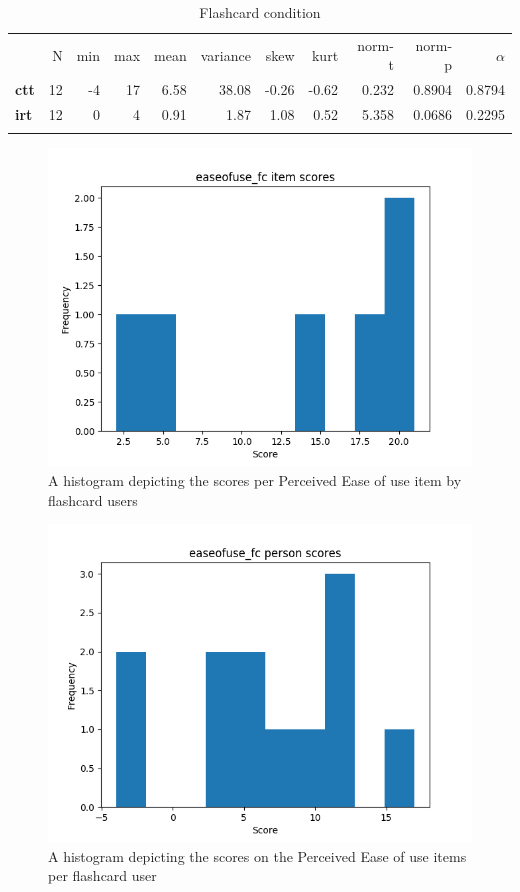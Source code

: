 \begin{longtable}[c]{@{}lrrrrrrrrrr@{}}
\caption{Flashcard condition}
\endfirsthead
\toprule\addlinespace
& N & min & max & mean & variance & skew & kurt & norm-t &
norm-p & $\alpha$
\\\addlinespace
\midrule
\textbf{ctt} & 12 & -4 & 17 & 6.58 & 38.08 & -0.26 & -0.62 & 0.232 &
0.8904 & 0.8794
\\\addlinespace
\textbf{irt} & 12 & 0 & 4 & 0.91 & 1.87 & 1.08 & 0.52 & 5.358 & 0.0686 &
0.2295
\\\addlinespace
\bottomrule
    \label{tab:easeofuse_fc}
\end{longtable}

\begin{figure}
    \centering
    \includegraphics[width=.7\textwidth]{img/easeofuse_fc_diff.png}
    \caption{A histogram depicting the scores per Perceived Ease of use item by flashcard users}
    \label{fig:easeofuse_fc_diff}
\end{figure}
\begin{figure}
    \centering
    \includegraphics[width=.7\textwidth]{img/easeofuse_fc_abil.png}
    \caption{A histogram depicting the scores on the Perceived Ease of use items per flashcard user}
    \label{fig:easeofuse_fc_abil}
\end{figure}

